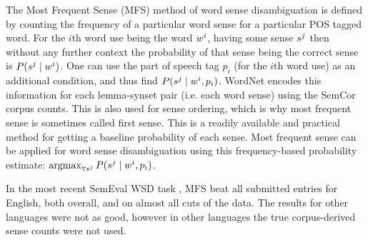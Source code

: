 \documentclass[12pt,parskip]{komatufte}
\begin{document}
The Most Frequent Sense (MFS) method of word sense disambiguation is defined by counting the frequency of a particular word sense for a particular POS tagged word.
For the $i$th word use being the word $\n w_i$, having some sense $\n s_j$
then without any further context the 
probability of that sense being the correct sense is $P(\n s_j \mid \n w_i)$.
One can use the part of speech tag $p_i$ (for the $i$th word use) as an additional condition, and thus find $P(\n s_j \mid \n w_i, p_i)$.
WordNet encodes this information for each lemma-synset pair (i.e. each word sense) using the SemCor corpus counts.
This is also used for sense ordering, which is why most frequent sense  is sometimes called first sense.
This is a readily available and practical method for getting a baseline probability of each sense.
Most frequent sense can be applied for word sense disambiguation using this frequency-based probability estimate:  $\argmax_{\forall \n s_j} P(\n s_j \mid \n w_i, p_i)$.


In the most recent SemEval WSD task ,
MFS beat all submitted entries for English, both overall, and on almost all cuts of the data.
The results for other languages were not as good, however in other languages the true corpus-derived sense counts were not used.
\end{document}
